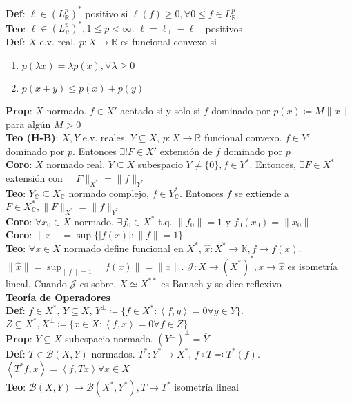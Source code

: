 \documentclass[9pt]{extarticle}
\newcommand{\C}{\mathbb{C}}
\newcommand{\R}{\mathbb{R}}
\newcommand{\K}{\mathbb{K}}
\newcommand{\inn}[1]{\left\langle #1\right\rangle}
\begin{document}
\begin{multicols*}{2}
\textbf{Def}: $\ell\in (L^p_\R)^*$ positivo si $\ell(f)\geq 0,\forall 0\leq f\in L^p_\R$\\
\textbf{Teo}: $\ell\in (L^p_\R)^*,1\leq p<\infty$. $\ell=\ell_+-\ell_{-}$ positivos\\
\textbf{Def}: $X$ e.v. real. $p:X\to\R$ es funcional convexo si\begin{enumerate}
	\item $p(\lambda x)=\lambda p(x),\forall \lambda\geq 0$
	\item $p(x+y)\leq p(x)+p(y)$
\end{enumerate}
\textbf{Prop}: $X$ normado. $f\in X'$ acotado si y solo si $f$ dominado por $p(x)\coloneqq M\|x\|$ para algún $M>0$\\
\textbf{Teo (H-B)}: $X,Y$ e.v. reales, $Y\subseteq X$, $p:X\to\R$ funcional convexo. $f\in Y'$ dominado por $p$. Entonces $\exists! F\in X'$ extensión de $f$ dominado por $p$\\
\textbf{Coro}: $X$ normado real. $Y\subseteq X$ subespacio $Y\neq \{0\},f\in Y^*$. Entonces, $\exists F\in X^*$ extensión con $\|F\|_{X^*}=\|f\|_{Y^*}$\\
\textbf{Teo}: $Y_\C\subseteq X_\C$ normado complejo, $f\in Y_\C^*$. Entonces $f$ se extiende a $F\in X_\C^*, \|F\|_{X^*}=\|f\|_{Y^*}$\\
\textbf{Coro}: $\forall x_0\in X$ normado, $\exists f_0\in X^*$ t.q. $\|f_0\|=1$ y $f_0(x_0)=\|x_0\|$\\
\textbf{Coro}: $\|x\|=\sup\{|f(x)|:\|f\|=1\}$\\
\textbf{Teo}: $\forall x\in X$ normado define funcional en $X^*$, $\hat x:X^*\to\K, f\to f(x)$. $\|\hat x\|=\sup_{\|f\|=1}\|f(x)\|=\|x\|$. $\mathcal{J}:X\to (X^*)^*, x\to\hat x$ es isometría lineal. Cuando $\mathcal{J}$ es sobre, $X\simeq X^{**}$ es Banach y se dice reflexivo\\
\large\textbf{Teoría de Operadores}\\\normalsize
\textbf{Def}: $f\in X^*$, $Y\subseteq X$, $Y^\perp\coloneqq \{f\in X^*:\inn{f,y}=0\forall y\in Y\}$. $Z\subseteq X^*, X^\perp\coloneqq \{x\in X:\inn{f,x}=0\forall f\in Z\}$\\
\textbf{Prop}: $Y\subseteq X$ subespacio normado. $(Y^\perp)^\perp=\overline{Y}$\\
\textbf{Def}: $T\in\mathcal{B}(X,Y)$ normados. $T^*:Y^*\to X^*$, $f\circ T\eqqcolon T^*(f)$. $\inn{T^* f,x}=\inn{f, Tx}\forall x\in X$\\
\textbf{Teo}: $\mathcal{B}(X,Y)\to\mathcal{B}(X^*,Y^*), T\to T^*$ isometría lineal\begin{enumerate}

\end{enumerate}
\end{multicols*}
\end{document}
